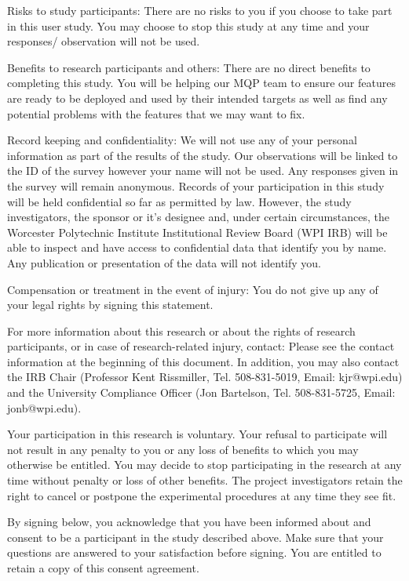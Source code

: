 Risks to study participants:  There are no risks to you if you choose to take part in this user study. 
You may choose to stop this study at any time and your responses/ observation will not be used. 

Benefits to research participants and others:  There are no direct benefits to completing this study. You will be helping our MQP 
team to ensure our features are ready to be deployed and used by their intended targets as well as find any potential problems 
with the features that we may want to fix.

Record keeping and confidentiality: We will not use any of your personal information as part of the results of the study. 
Our observations will be linked to the ID of the survey however your name will not be used. Any responses given in the survey will remain anonymous. 
Records of your participation in this study will be held confidential so far as permitted by law. However, the study investigators, 
the sponsor or it's designee and, under certain circumstances, the Worcester Polytechnic Institute Institutional Review Board 
(WPI IRB) will be able to inspect and have access to confidential data that identify you by name.  
Any publication or presentation of the data will not identify you.

Compensation or treatment in the event of injury:  You do not give up any of your legal rights by signing this statement.

For more information about this research or about the rights of research participants, or in case of research-related injury, contact: 
Please see the contact information at the beginning of this document. In addition, you may also contact the IRB Chair 
(Professor Kent Rissmiller, Tel. 508-831-5019, Email:  kjr@wpi.edu) and the University Compliance Officer (Jon Bartelson, Tel. 508-831-5725, Email:  jonb@wpi.edu).

Your participation in this research is voluntary.  Your refusal to participate will not result in any penalty to you or any loss of benefits to 
which you may otherwise be entitled.  You may decide to stop participating in the research at any time without penalty or loss of other benefits.  
The project investigators retain the right to cancel or postpone the experimental procedures at any time they see fit. 

By signing below, you acknowledge that you have been informed about and consent to be a participant in the study described above.  
Make sure that your questions are answered to your satisfaction before signing.  You are entitled to retain a copy of this consent agreement.

